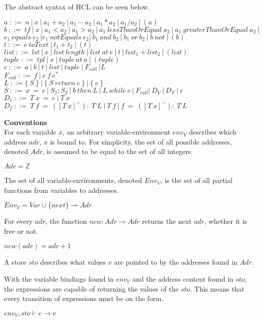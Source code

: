 The abstract syntax of HCL can be seen below.

$a\ ::=\ n\ |\ x\ |\ a_1+a_2\ |\ a_1-a_2\ |\ a_1*a_2\ |\ a_1/a_2\ |\ (a)$\\
$b\ ::=\ tf\ |\ x\ |\ a_1<a_2\ |\ a_1>a_2\ |\ a_1\ lessThanOrEqual\ a_2\ |\ a_1\ greaterThanOrEqual\ a_2\ |$\\ 
\phantom{xyzq.} $ e_1\ equals\ e_2\ | e_1\ notEquals\ e_2|\ b_1\ and\ b_2\ |\ b_1\ or\ b_2\ |\ b\ not\ | \ (b)$\\
$t\ ::=\ e\ toText\ |\ t_1+t_2\ |\ (t)$\\
$list\  ::=\ lst\ |\ x\ |\ list\ length\ |\ list\ at\ e\ |\ t\ |\ list_1 + list_2\ |\ (list)$\\
$tuple\ ::=\ tpl\ |\ x\ |\ tuple\ at\ a\ |\ (tuple)$\\
$e\     ::=\ a\ |\ b\ |\ t\ |\ list\ |\ tuple\ |\ F_{call}\ | L$\\
$F_{call}\ ::=\ f\ |\ e\ f\ e^*$\\
$L\     ::= \{\ S\ \}\ |\ \{\ S\ return\ e\ \}\ |\ \{\ e\ \}$\\
$S\     ::=\ x\ =\ e\ |\ S_1;S_2\ |\ b\ then\ L\ |\ L\ while\ e\ |\ F_{call} |\ D_V\ |\ D_F\ |\ \epsilon$\\
$D_v\   ::=\ T\ x\ =\ e\ |\ T\ x\ $\\
$D_f\   ::=\ T\ f\ =\ ([T\ x]^\sim):\ T\ L\ |\ T\ f\ |\ f\ =\ ([T\ x]^\sim):\ T\ L$

\textbf{\large{Conventions}} \\
For each variable $x$, an arbitrary variable-environment $env_V$ describes which address $adr$, $x$ is bound to.
For simplicity, the set of all possible addresses, denoted $Adr$, is assumed to be equal to the set of all integers.
\begin{center}
	$Adr = \mathbb{Z}$
\end{center}
The set of all variable-environments, denoted \textbf{$Env_V$}, is the set of all partial functions from variables to addresses.
\begin{center}
	$Env_V = Var \cup \{next\} \rightharpoonup Adr$
\end{center}
For every $adr$, the function $new : Adr \rightarrow Adr$ returns the next $adr$, whether it is free or not.
\begin{center}
	$new (adr) = adr + 1$
\end{center}
A store $sto$ describes what values $v$ are pointed to by the addresses found in $Adr$.

With the variable bindings found in $env_V$ and the address content found in $sto$, the expressions are capable of returning the values of the $sto$.
This means that every transition of expressions must be on the form.
\begin{center}
	$env_V,sto \vdash e \rightarrow v$
\end{center} 

